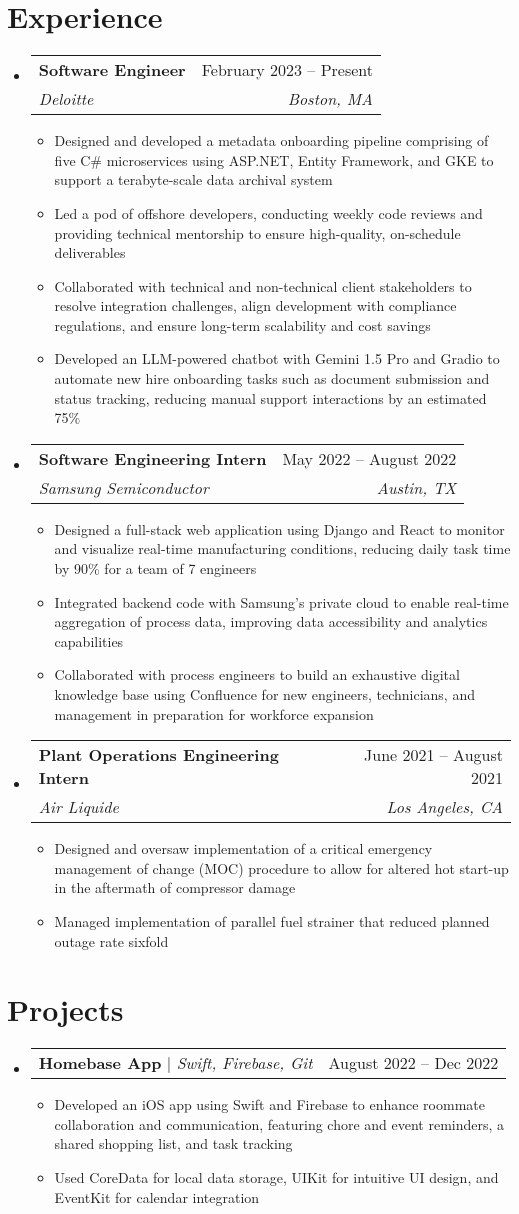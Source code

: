 \documentclass[letterpaper,11pt]{article}
\makeatletter
\newcommand{\resumeItem}[1]{
  \item\small{
    {#1 \vspace{-2pt}}
  }
}
\newcommand{\resumeSubheading}[4]{
  \vspace{-2pt}\item
    \begin{tabular*}{0.97\textwidth}[t]{l@{\extracolsep{\fill}}r}
      \textbf{#1} & #2 \\
      \textit{\small#3} & \textit{\small #4} \\
    \end{tabular*}\vspace{-7pt}
}
\newcommand{\resumeProjectHeading}[2]{
    \item
    \begin{tabular*}{0.97\textwidth}{l@{\extracolsep{\fill}}r}
      \small#1 & #2 \\
    \end{tabular*}\vspace{-7pt}
}
\newcommand{\resumeSubHeadingListStart}{\begin{itemize}[leftmargin=0.15in, label={}]}
\newcommand{\resumeSubHeadingListEnd}{\end{itemize}}
\newcommand{\resumeItemListStart}{\begin{itemize}}
\newcommand{\resumeItemListEnd}{\end{itemize}\vspace{-5pt}}
\makeatother
\begin{document}
\section{Experience}
  \resumeSubHeadingListStart    
    \resumeSubheading
      {Software Engineer}{February 2023 -- Present}
      {Deloitte}{Boston, MA}
      \resumeItemListStart
        \resumeItem{Designed and developed a metadata onboarding pipeline comprising of five C\# microservices using  ASP.NET, Entity Framework, and GKE to support a terabyte-scale data archival system}
        \resumeItem{Led a pod of offshore developers, conducting weekly code reviews and providing technical mentorship to ensure high-quality, on-schedule deliverables}
        \resumeItem{Collaborated with technical and non-technical client stakeholders to resolve integration challenges, align development with compliance regulations, and ensure long-term scalability and cost savings}
        \resumeItem{Developed an LLM-powered chatbot with Gemini 1.5 Pro and Gradio to automate new hire onboarding tasks such as document submission and status tracking, reducing manual support interactions by an estimated 75\%}
      \resumeItemListEnd
    \resumeSubheading
      {Software Engineering Intern}{May 2022 -- August 2022}
      {Samsung Semiconductor}{Austin, TX}
      \resumeItemListStart
        \resumeItem{Designed a full-stack web application using Django and React to monitor and visualize real-time manufacturing conditions, reducing daily task time by 90\% for a team of 7 engineers}
        \resumeItem{Integrated backend code with Samsung's private cloud to enable real-time aggregation of process data, improving data accessibility and analytics capabilities}
        \resumeItem{Collaborated with process engineers to build an exhaustive digital knowledge base using Confluence for new engineers, technicians, and management in preparation for workforce expansion}
      \resumeItemListEnd
    \resumeSubheading
      {Plant Operations Engineering Intern}{June 2021 -- August 2021}
      {Air Liquide}{Los Angeles, CA}
      \resumeItemListStart
        \resumeItem{Designed and oversaw implementation of a critical emergency management of change (MOC) procedure to allow for altered hot start-up in the aftermath of compressor damage}
        \resumeItem{Managed implementation of parallel fuel strainer that reduced planned outage rate sixfold}
      \resumeItemListEnd

  \resumeSubHeadingListEnd

\section{Projects}
    \resumeSubHeadingListStart
      \resumeProjectHeading
          {\textbf{Homebase App} $|$ \emph{Swift, Firebase, Git}}{August 2022 -- Dec 2022}
          \resumeItemListStart
            \resumeItem{Developed an iOS app using Swift and Firebase to enhance roommate collaboration and communication, featuring chore and event reminders, a shared shopping list, and task tracking}
            \resumeItem{Used CoreData for local data storage, UIKit for intuitive UI design, and EventKit for calendar integration}
          \resumeItemListEnd
    \resumeSubHeadingListEnd
\end{document}
